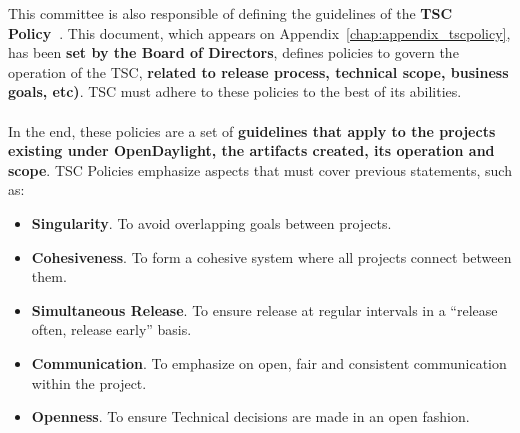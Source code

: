 \documentclass[a4paper, 12pt]{book}
\begin{document}
This committee is also responsible of defining the guidelines of the \textbf{TSC Policy~\cite{OpenDaylightTSCPolicy}}. This document, which appears on Appendix~\ref{chap:appendix_tscpolicy}, has been \textbf{set by the Board of Directors}, defines policies to govern the operation of the TSC, \textbf{related to release process, technical scope, business goals, etc)}. TSC must adhere to these policies to the best of its abilities.\\
\\
In the end, these policies are a set of \textbf{guidelines that apply to the projects existing under OpenDaylight, the artifacts created, its operation and scope}. TSC Policies emphasize aspects that must cover previous statements, such as:
\begin{itemize}\itemsep0pt
\item{\textbf{Singularity}}. To avoid overlapping goals between projects.
\item{\textbf{Cohesiveness}}. To form a cohesive system where all projects connect between them.
\item{\textbf{Simultaneous Release}}. To ensure release at regular intervals in a ``release often, release early'' basis.
\item{\textbf{Communication}}.  To emphasize on open, fair and consistent communication within the project.
\item{\textbf{Openness}}. To ensure Technical decisions are made in an open fashion.
\end{itemize}
\end{document}
